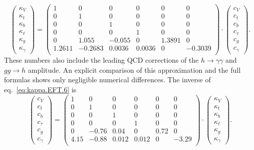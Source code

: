 \begin{equation}
  \label{eq:kappa.EFT.6}
  \begin{pmatrix}
    \kappa_{V}\\
    \kappa_{t}\\
    \kappa_{b}\\
    \kappa_{\ell}\\
    \kappa_{g}\\
    \kappa_{\gamma}
  \end{pmatrix}
  = 
  \begin{pmatrix}
    1 & 0 & 0 & 0 & 0 & 0 \\
    0 & 1 & 0 & 0 & 0 & 0 \\
    0 & 0 & 1 & 0 & 0 & 0 \\
    0 & 0 & 0 & 1 & 0 & 0 \\
    0 & 1.055 & -0.055 & 0 & 1.3891 & 0 \\
    1.2611 & -0.2683 & 0.0036 & 0.0036 & 0 & -0.3039 \\
  \end{pmatrix}
  \cdot
  \begin{pmatrix}
    c_{V}\\
    c_{t}\\
    c_{b}\\
    c_{\tau}\\
    c_{g}\\
    c_{\gamma}
  \end{pmatrix}.
\end{equation}
%
These numbers also include the leading QCD corrections of the $h\to \gamma\gamma$ and $gg\to h$ amplitude. An explicit comparison of this approximation and the full formulas shows only negligible numerical differences. The inverse of eq.~\eqref{eq:kappa.EFT.6} is
\begin{equation}
  \label{eq:kappa.EFT.7}
  \begin{pmatrix}
    c_{V}\\
    c_{t}\\
    c_{b}\\
    c_{\tau}\\
    c_{g}\\
    c_{\gamma}
  \end{pmatrix}
  = 
  \begin{pmatrix}
    1 & 0 & 0 & 0 & 0 & 0 \\
    0 & 1 & 0 & 0 & 0 & 0 \\
    0 & 0 & 1 & 0 & 0 & 0 \\
    0 & 0 & 0 & 1 & 0 & 0 \\
    0 & -0.76 & 0.04 & 0 & 0.72 & 0 \\
    4.15 & -0.88 & 0.012 & 0.012 & 0 & -3.29 \\
  \end{pmatrix}
  \cdot
  \begin{pmatrix}
    \kappa_{V}\\
    \kappa_{t}\\
    \kappa_{b}\\
    \kappa_{\ell}\\
    \kappa_{g}\\
    \kappa_{\gamma}
  \end{pmatrix}.
\end{equation}

